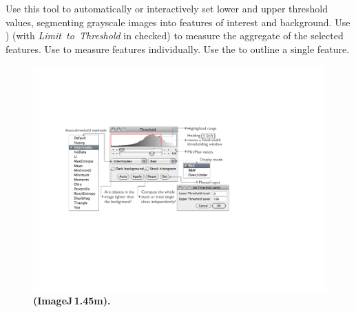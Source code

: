Use this tool to automatically or interactively set lower and upper
threshold values, segmenting grayscale images into
features of interest and background. Use )
(with \emph{Limit~to~Threshold} in 
checked) to measure the aggregate of the selected features. Use 
to measure features individually. Use the 
to outline a single feature.
\begin{figure}
\noindent \includegraphics[width=0.85\columnwidth]{images/Threshold}\caption{\label{Flo:ImageAdjust}\textbf{\protect{}
(ImageJ\,1.45m).}}
\end{figure}
